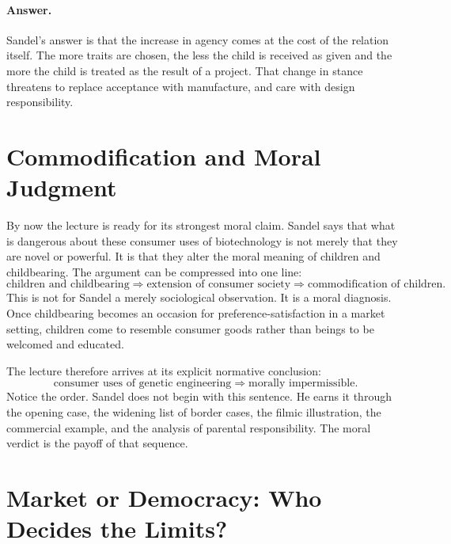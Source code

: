 \paragraph{Answer.} Sandel's answer is that the increase in agency comes at the cost of the relation itself. The more traits are chosen, the less the child is received as given and the more the child is treated as the result of a project. That change in stance threatens to replace acceptance with manufacture, and care with design responsibility.

\section{Commodification and Moral Judgment}

By now the lecture is ready for its strongest moral claim. Sandel says that what is dangerous about these consumer uses of biotechnology is not merely that they are novel or powerful. It is that they alter the moral meaning of children and childbearing. The argument can be compressed into one line:
\begin{equation}
\text{children and childbearing}
\Longrightarrow
\text{extension of consumer society}
\Longrightarrow
\text{commodification of children}.
\end{equation}
This is not for Sandel a merely sociological observation. It is a moral diagnosis. Once childbearing becomes an occasion for preference-satisfaction in a market setting, children come to resemble consumer goods rather than beings to be welcomed and educated.

The lecture therefore arrives at its explicit normative conclusion:
\begin{equation}
\text{consumer uses of genetic engineering}
\Longrightarrow
\text{morally impermissible}.
\end{equation}
Notice the order. Sandel does not begin with this sentence. He earns it through the opening case, the widening list of border cases, the filmic illustration, the commercial example, and the analysis of parental responsibility. The moral verdict is the payoff of that sequence.

\section{Market or Democracy: Who Decides the Limits?}

